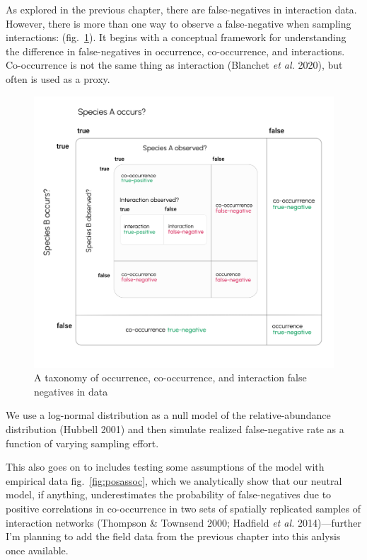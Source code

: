 \documentclass[11pt]{article}
\makeatletter
\def\maxwidth{\ifdim\Gin@nat@width>\linewidth\linewidth
\else\Gin@nat@width\fi}
\let\Oldincludegraphics\includegraphics
\renewcommand{\includegraphics}[1]{\Oldincludegraphics[width=\maxwidth]{#1}}
\makeatother
\begin{document}
As explored in the previous chapter, there are false-negatives in
interaction data. However, there is more than one way to observe a
false-negative when sampling interactions: (fig.~\ref{fig:fnrtaxonomy}).
It begins with a conceptual framework for understanding the difference
in false-negatives in occurrence, co-occurrence, and interactions.
Co-occurrence is not the same thing as interaction (Blanchet \emph{et
al.} 2020), but often is used as a proxy.

\begin{figure}
\hypertarget{fig:fnrtaxonomy}{%
\centering
\includegraphics{./figures/ch2.png}
\caption{A taxonomy of occurrence, co-occurrence, and interaction false
negatives in data}\label{fig:fnrtaxonomy}
}
\end{figure}

We use a log-normal distribution as a null model of the
relative-abundance distribution (Hubbell 2001) and then simulate
realized false-negative rate as a function of varying sampling effort.

This also goes on to includes testing some assumptions of the model with
empirical data fig.~\ref{fig:posassoc}, which we analytically show that
our neutral model, if anything, underestimates the probability of
false-negatives due to positive correlations in co-occurrence in two
sets of spatially replicated samples of interaction networks (Thompson
\& Townsend 2000; Hadfield \emph{et al.} 2014)---further I'm planning to
add the field data from the previous chapter into this anlysis once
available.
\end{document}
